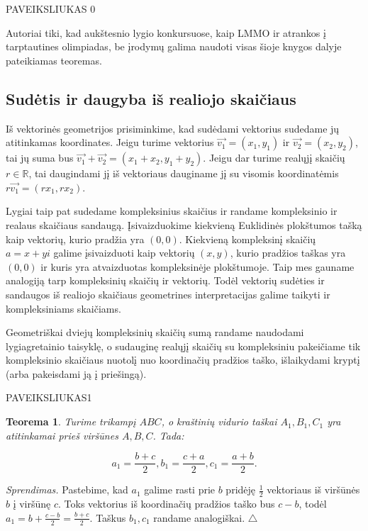 \documentclass[11pt,a4paper,twoside]{book}
\newenvironment{sprendimas}{\noindent \textit{Sprendimas.}}{\hfill $\triangle$}
\newtheorem{thmnr}{Teorema}
\theoremstyle{definition} \newtheorem*{api}{Apibrėžimas}
\theoremstyle{remark} \newtheorem*{pastaba}{Pastaba}
\begin{document}
PAVEIKSLIUKAS 0

Autoriai tiki, kad aukštesnio lygio konkursuose, kaip LMMO ir atrankos į tarptautines olimpiadas, be įrodymų galima naudoti visas šioje knygos dalyje pateikiamas teoremas.





\subsection*{Sudėtis ir daugyba iš realiojo skaičiaus}

Iš vektorinės geometrijos prisiminkime, kad sudėdami vektorius sudedame jų atitinkamas koordinates. Jeigu turime vektorius $\overrightarrow{v_1}=(x_1, y_1)$ ir $\overrightarrow{v_2}=(x_2, y_2)$, tai jų suma bus $\overrightarrow{v_1}+\overrightarrow{v_2}=(x_1+x_2, y_1+y_2)$. Jeigu dar turime realųjį skaičių $r \in \mathbb{R}$, tai daugindami jį iš vektoriaus dauginame jį su visomis koordinatėmis $r  \overrightarrow{v_1}=(r  x_1, r  x_2)$.

Lygiai taip pat sudedame kompleksinius skaičius ir randame kompleksinio ir realaus skaičiaus sandaugą. Įsivaizduokime kiekvieną Euklidinės plokštumos tašką kaip vektorių, kurio pradžia yra $(0, 0)$. Kiekvieną kompleksinį skaičių $a = x + yi$ galime įsivaizduoti kaip vektorių $(x, y)$, kurio pradžios taškas yra $(0, 0)$ ir kuris yra atvaizduotas kompleksinėje plokštumoje. Taip mes gauname analogiją tarp kompleksinių skaičių ir vektorių. Todėl vektorių sudėties ir sandaugos iš realiojo skaičiaus geometrines interpretacijas galime taikyti ir kompleksiniams skaičiams.


Geometriškai dviejų kompleksinių skaičių sumą randame naudodami lygiagretainio taisyklę, o sudauginę realųjį skaičių su kompleksiniu pakeičiame tik kompleksinio skaičiaus nuotolį nuo koordinačių pradžios taško, išlaikydami kryptį (arba pakeisdami ją į priešingą). 






PAVEIKSLIUKAS1

\begin{thmnr}
Turime trikampį $ABC$, o kraštinių vidurio taškai $A_1, B_1, C_1$ yra atitinkamai prieš viršūnes $A, B, C$. Tada: 

$$a_1 = \frac{b+c}{2}, b_1 = \frac{c+a}{2}, c_1 = \frac{a+b}{2}.$$

\end{thmnr}
\begin{sprendimas}
Pastebime, kad $a_1$ galime rasti prie $b$ pridėję $\frac{1}{2}$ vektoriaus iš viršūnės $b$ į viršūnę $c$. Toks vektorius iš koordinačių pradžios taško bus $c-b$, todėl $a_1 = b + \frac{c-b}{2}=\frac{b+c}{2}$. Taškus $b_1, c_1$ randame analogiškai.
\end{sprendimas}
\end{document}
